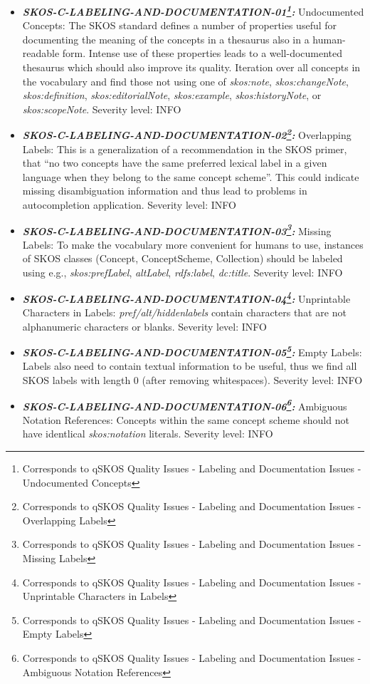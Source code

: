 \documentclass{llncs}
\begin{document}
\begin{itemize}
	\item \textbf{{\em SKOS-C-LABELING-AND-DOCUMENTATION-01\footnote{Corresponds to qSKOS Quality Issues - Labeling and Documentation Issues - Undocumented Concepts}:}}
	Undocumented Concepts:
  The SKOS standard defines a number of properties useful for documenting the meaning of the concepts in a thesaurus also in a human-readable form. Intense use of these properties leads to a well-documented thesaurus which should also improve its quality.  
	Iteration over all concepts in the vocabulary and find those not using one of \emph{skos:note}, \emph{skos:changeNote}, \emph{skos:definition}, \emph{skos:editorialNote}, \emph{skos:example}, \emph{skos:historyNote}, or \emph{skos:scopeNote}.
  Severity level: INFO
	\item \textbf{{\em SKOS-C-LABELING-AND-DOCUMENTATION-02\footnote{Corresponds to qSKOS Quality Issues - Labeling and Documentation Issues - Overlapping Labels}:}}
	Overlapping Labels:
	This is a generalization of a recommendation in the SKOS primer, that “no two concepts have the same preferred lexical label in a given language when they belong to the same concept scheme”. This could indicate missing disambiguation information and thus lead to problems in autocompletion application. 
	Severity level: INFO
	\item \textbf{{\em SKOS-C-LABELING-AND-DOCUMENTATION-03\footnote{Corresponds to qSKOS Quality Issues - Labeling and Documentation Issues - Missing Labels}:}}
	Missing Labels:
	To make the vocabulary more convenient for humans to use, instances of SKOS classes (Concept, ConceptScheme, Collection) should be labeled using e.g., \emph{skos:prefLabel}, \emph{altLabel}, \emph{rdfs:label}, \emph{dc:title}. 
	Severity level: INFO
	\item \textbf{{\em SKOS-C-LABELING-AND-DOCUMENTATION-04\footnote{Corresponds to qSKOS Quality Issues - Labeling and Documentation Issues - Unprintable Characters in Labels}:}}
	Unprintable Characters in Labels:
	\emph{pref/alt/hiddenlabels} contain characters that are not alphanumeric characters or blanks.
	Severity level: INFO
	\item \textbf{{\em SKOS-C-LABELING-AND-DOCUMENTATION-05\footnote{Corresponds to qSKOS Quality Issues - Labeling and Documentation Issues - Empty Labels}:}}
	Empty Labels:
	Labels also need to contain textual information to be useful, thus we find all SKOS labels with length 0 (after removing whitespaces). 
	Severity level: INFO
	\item \textbf{{\em SKOS-C-LABELING-AND-DOCUMENTATION-06\footnote{Corresponds to qSKOS Quality Issues - Labeling and Documentation Issues - Ambiguous Notation References}:}}
	Ambiguous Notation References:
	Concepts within the same concept scheme should not have identlical \emph{skos:notation} literals. 
	Severity level: INFO
\end{itemize}
\end{document}
